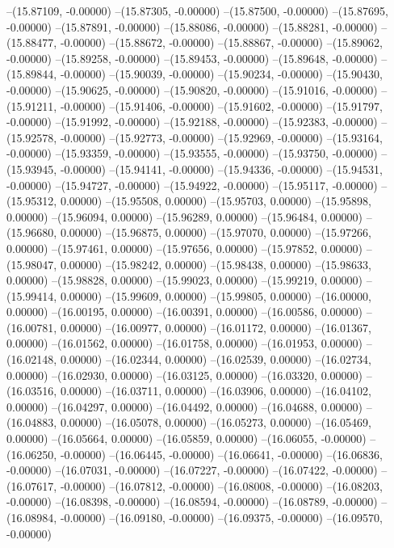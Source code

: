 --(15.87109, -0.00000)
--(15.87305, -0.00000)
--(15.87500, -0.00000)
--(15.87695, -0.00000)
--(15.87891, -0.00000)
--(15.88086, -0.00000)
--(15.88281, -0.00000)
--(15.88477, -0.00000)
--(15.88672, -0.00000)
--(15.88867, -0.00000)
--(15.89062, -0.00000)
--(15.89258, -0.00000)
--(15.89453, -0.00000)
--(15.89648, -0.00000)
--(15.89844, -0.00000)
--(15.90039, -0.00000)
--(15.90234, -0.00000)
--(15.90430, -0.00000)
--(15.90625, -0.00000)
--(15.90820, -0.00000)
--(15.91016, -0.00000)
--(15.91211, -0.00000)
--(15.91406, -0.00000)
--(15.91602, -0.00000)
--(15.91797, -0.00000)
--(15.91992, -0.00000)
--(15.92188, -0.00000)
--(15.92383, -0.00000)
--(15.92578, -0.00000)
--(15.92773, -0.00000)
--(15.92969, -0.00000)
--(15.93164, -0.00000)
--(15.93359, -0.00000)
--(15.93555, -0.00000)
--(15.93750, -0.00000)
--(15.93945, -0.00000)
--(15.94141, -0.00000)
--(15.94336, -0.00000)
--(15.94531, -0.00000)
--(15.94727, -0.00000)
--(15.94922, -0.00000)
--(15.95117, -0.00000)
--(15.95312, 0.00000)
--(15.95508, 0.00000)
--(15.95703, 0.00000)
--(15.95898, 0.00000)
--(15.96094, 0.00000)
--(15.96289, 0.00000)
--(15.96484, 0.00000)
--(15.96680, 0.00000)
--(15.96875, 0.00000)
--(15.97070, 0.00000)
--(15.97266, 0.00000)
--(15.97461, 0.00000)
--(15.97656, 0.00000)
--(15.97852, 0.00000)
--(15.98047, 0.00000)
--(15.98242, 0.00000)
--(15.98438, 0.00000)
--(15.98633, 0.00000)
--(15.98828, 0.00000)
--(15.99023, 0.00000)
--(15.99219, 0.00000)
--(15.99414, 0.00000)
--(15.99609, 0.00000)
--(15.99805, 0.00000)
--(16.00000, 0.00000)
--(16.00195, 0.00000)
--(16.00391, 0.00000)
--(16.00586, 0.00000)
--(16.00781, 0.00000)
--(16.00977, 0.00000)
--(16.01172, 0.00000)
--(16.01367, 0.00000)
--(16.01562, 0.00000)
--(16.01758, 0.00000)
--(16.01953, 0.00000)
--(16.02148, 0.00000)
--(16.02344, 0.00000)
--(16.02539, 0.00000)
--(16.02734, 0.00000)
--(16.02930, 0.00000)
--(16.03125, 0.00000)
--(16.03320, 0.00000)
--(16.03516, 0.00000)
--(16.03711, 0.00000)
--(16.03906, 0.00000)
--(16.04102, 0.00000)
--(16.04297, 0.00000)
--(16.04492, 0.00000)
--(16.04688, 0.00000)
--(16.04883, 0.00000)
--(16.05078, 0.00000)
--(16.05273, 0.00000)
--(16.05469, 0.00000)
--(16.05664, 0.00000)
--(16.05859, 0.00000)
--(16.06055, -0.00000)
--(16.06250, -0.00000)
--(16.06445, -0.00000)
--(16.06641, -0.00000)
--(16.06836, -0.00000)
--(16.07031, -0.00000)
--(16.07227, -0.00000)
--(16.07422, -0.00000)
--(16.07617, -0.00000)
--(16.07812, -0.00000)
--(16.08008, -0.00000)
--(16.08203, -0.00000)
--(16.08398, -0.00000)
--(16.08594, -0.00000)
--(16.08789, -0.00000)
--(16.08984, -0.00000)
--(16.09180, -0.00000)
--(16.09375, -0.00000)
--(16.09570, -0.00000)

